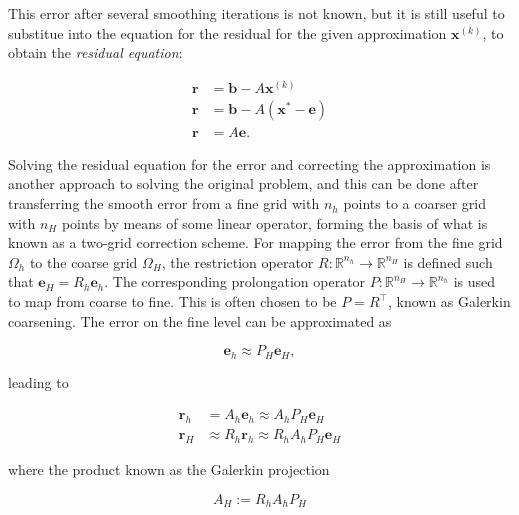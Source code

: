 This error after several smoothing iterations is not known, but it is still useful to substitue into the equation for the residual for the given approximation $\mathbf{x}^{(k)}$, to obtain the \emph{residual equation}:

\begin{equation}
	\begin{aligned}
	\mathbf{r} &= \mathbf{b} - A\mathbf{x}^{(k)} \\
	\mathbf{r} &= \mathbf{b} - A\left( \mathbf{x}^* - \mathbf{e} \right) \\
	\mathbf{r} &= A\mathbf{e}.
	\end{aligned}
\end{equation}


Solving the residual equation for the error and correcting the approximation is another approach to solving the original problem, and this can be done after transferring the smooth error from a fine grid with $n_h$ points to a coarser grid with $n_H$ points by means of some linear operator, forming the basis of what is known as a two-grid correction scheme. For mapping the error from the fine grid $\Omega_h$ to the coarse grid $\Omega_H$, the restriction operator $R : \mathbb{R}^{n_h} \rightarrow \mathbb{R}^{n_H}$ is defined such that $\mathbf{e}_H = R_h \mathbf{e}_h$. The corresponding prolongation operator $P : \mathbb{R}^{n_H} \rightarrow \mathbb{R}^{n_h}$ is used to map from coarse to fine. This is often chosen to be $P = R^\top$, known as Galerkin coarsening. The error on the fine level can be approximated as

\begin{equation}
	\mathbf{e}_h \approx P_H \mathbf{e}_H,
\end{equation}

leading to

\begin{equation}
	\begin{aligned}
	\mathbf{r}_h & = A_h \mathbf{e}_h \approx A_h P_H \mathbf{e}_H \\
	\mathbf{r}_H & \approx R_h \mathbf{r}_h \approx R_h A_h P_H \mathbf{e}_H
	\end{aligned}
\end{equation}

where the product known as the Galerkin projection

\begin{equation}
	\label{eq:Galerkin}
	A_H := R_h A_h P_H
\end{equation}

